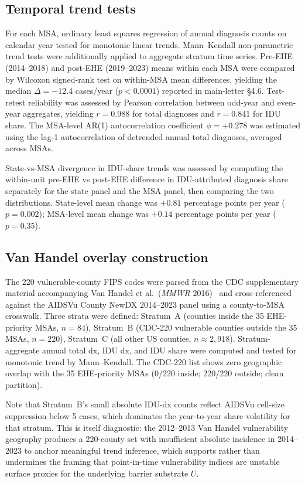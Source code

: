 \documentclass[11pt]{article}
\begin{document}
\subsection{Temporal trend tests}

For each MSA, ordinary least squares regression of annual diagnosis counts on calendar year tested for monotonic linear trends. Mann--Kendall non-parametric trend tests were additionally applied to aggregate stratum time series. Pre-EHE (2014--2018) and post-EHE (2019--2023) means within each MSA were compared by Wilcoxon signed-rank test on within-MSA mean differences, yielding the median $\Delta = -12.4$ cases/year ($p < 0.0001$) reported in main-letter §4.6. Test-retest reliability was assessed by Pearson correlation between odd-year and even-year aggregates, yielding $r = 0.988$ for total diagnoses and $r = 0.841$ for IDU share. The MSA-level AR(1) autocorrelation coefficient $\phi = +0.278$ was estimated using the lag-1 autocorrelation of detrended annual total diagnoses, averaged across MSAs.

State-vs-MSA divergence in IDU-share trends was assessed by computing the within-unit pre-EHE vs post-EHE difference in IDU-attributed diagnosis share separately for the state panel and the MSA panel, then comparing the two distributions. State-level mean change was $+0.81$ percentage points per year ($p = 0.002$); MSA-level mean change was $+0.14$ percentage points per year ($p = 0.35$).

\subsection{Van Handel overlay construction}

The 220 vulnerable-county FIPS codes were parsed from the CDC supplementary material accompanying Van Handel et al.\ (\emph{MMWR} 2016)~\cite{vanhandel2016} and cross-referenced against the AIDSVu County NewDX 2014--2023 panel using a county-to-MSA crosswalk. Three strata were defined: Stratum~A (counties inside the 35 EHE-priority MSAs, $n = 84$), Stratum~B (CDC-220 vulnerable counties outside the 35 MSAs, $n = 220$), Stratum~C (all other US counties, $n \approx 2{,}918$). Stratum-aggregate annual total dx, IDU dx, and IDU share were computed and tested for monotonic trend by Mann--Kendall. The CDC-220 list shows zero geographic overlap with the 35 EHE-priority MSAs (0/220 inside; 220/220 outside; clean partition).

Note that Stratum~B's small absolute IDU-dx counts reflect AIDSVu cell-size suppression below 5 cases, which dominates the year-to-year share volatility for that stratum. This is itself diagnostic: the 2012--2013 Van Handel vulnerability geography produces a 220-county set with insufficient absolute incidence in 2014--2023 to anchor meaningful trend inference, which supports rather than undermines the framing that point-in-time vulnerability indices are unstable surface proxies for the underlying barrier substrate $U$.
\end{document}
